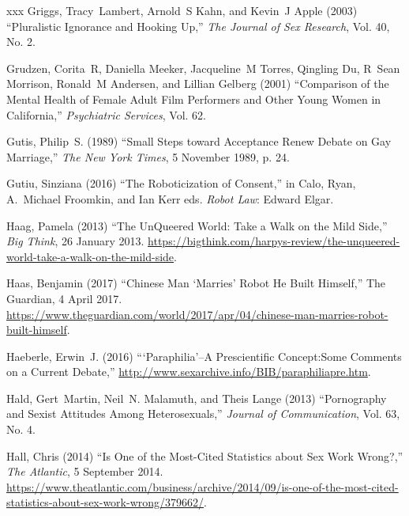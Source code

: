 \documentclass[]{jlreq} \usepackage{mystyle}
\begin{document}
\begin{thebibliography}{xxx}
Griggs, Tracy~Lambert, Arnold~S Kahn, and Kevin~J Apple (2003) ``Pluralistic
  Ignorance and Hooking Up,'' \textit{ The Journal of Sex Research}, Vol. 40,
  No. 2.

Grudzen, Corita~R, Daniella Meeker, Jacqueline~M Torres, Qingling Du, R~Sean
  Morrison, Ronald~M Andersen, and Lillian Gelberg (2001) ``Comparison of the
  Mental Health of Female Adult Film Performers and Other Young Women in
  California,'' \textit{ Psychiatric Services}, Vol. 62.

Gutis, Philip~S. (1989) ``Small Steps toward Acceptance Renew Debate on Gay
  Marriage,'' \emph{The New York Times}, 5 November 1989, p. 24.

Gutiu, Sinziana (2016) ``The Roboticization of Consent,'' in Calo, Ryan,
  A.~Michael Froomkin, and Ian Kerr eds.   \textit{ Robot Law}: Edward Elgar.

Haag, Pamela (2013) ``The UnQueered World: Take a Walk on the Mild Side,''
  \emph{Big Think}, 26 January 2013.
  \url{https://bigthink.com/harpys-review/the-unqueered-world-take-a-walk-on-the-mild-side}.

Haas, Benjamin (2017) ``Chinese Man `Marries' Robot He Built Himself,'' The
  Guardian, 4 April 2017.
  \url{https://www.theguardian.com/world/2017/apr/04/chinese-man-marries-robot-built-himself}.

Haeberle, Erwin~J. (2016) ```Paraphilia'--A Prescientific Concept:Some Comments
  on a Current Debate,''
  \url{http://www.sexarchive.info/BIB/paraphiliapre.htm}.

Hald, Gert~Martin, Neil~N. Malamuth, and Theis Lange (2013) ``Pornography and
  Sexist Attitudes Among Heterosexuals,'' \textit{ Journal of Communication},
  Vol. 63, No. 4.

Hall, Chris (2014) ``Is One of the Most-Cited Statistics about Sex Work
  Wrong?,'' \emph{The Atlantic}, 5 September 2014.
  \url{https://www.theatlantic.com/business/archive/2014/09/is-one-of-the-most-cited-statistics-about-sex-work-wrong/379662/}.


\end{thebibliography}
\end{document}
